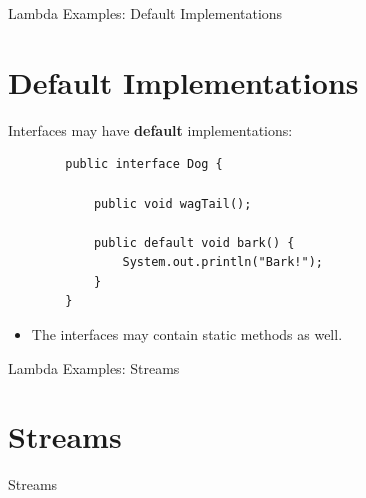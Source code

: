\documentclass{beamer}
\begin{document}
	\begin{frame}[fragile]{Lambda Examples: Default Implementations}
		\section{Default Implementations}
		
		Interfaces may have \textbf{default} implementations: 
		\begin{lstlisting}
		public interface Dog {
		
		    public void wagTail();
			
		    public default void bark() {
		        System.out.println("Bark!");
		    }
		}
		\end{lstlisting}
		\begin{itemize}
			\item The interfaces may contain static methods as well.
		\end{itemize}
	\end{frame}
	
	\begin{frame}[fragile]{Lambda Examples: Streams}
		\section{Streams}

		\begin{center}
		\Huge Streams
		\end{center}


	\end{frame}	
\end{document}
